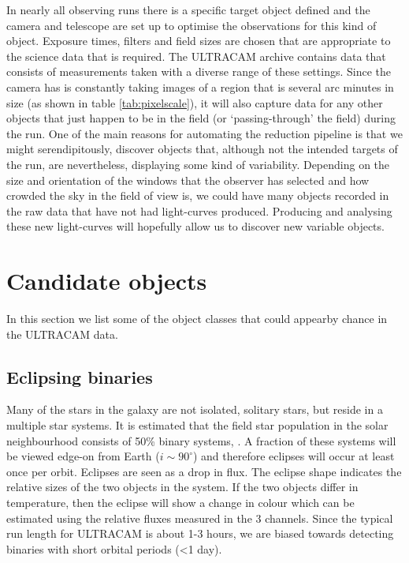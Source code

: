 In nearly all observing runs there is a specific target object defined and the camera and telescope are set up to optimise the observations for this kind of object. Exposure times, filters and field sizes are chosen that are appropriate to the science data that is required. The ULTRACAM archive contains data that consists of measurements taken with a diverse range of these settings. Since the camera has is constantly taking images of a region that is several arc minutes in size (as shown in table \ref{tab:pixelscale}), it will also capture data for any other objects that just happen to be in the field (or `passing-through' the field) during the run. One of the main reasons for automating the reduction pipeline is that we might serendipitously, discover objects that, although not the intended targets of the run, are nevertheless, displaying some kind of variability. Depending on the size and orientation of the windows that the observer has selected and how crowded the sky in the field of view is, we could have many objects recorded in the raw data that have not had light-curves produced. Producing and analysing these new light-curves will hopefully allow us to discover new variable objects. 

\section{Candidate objects}
In this section we list some of the object classes that could appearby chance in the ULTRACAM data.

\subsection{Eclipsing binaries}
Many of the stars in the galaxy are not isolated, solitary stars, but reside in a multiple star systems. It is estimated that the field star population in the solar neighbourhood consists of 50\% binary systems, \citep{binaryfraction}. A fraction of these systems will be viewed edge-on from Earth ($i \sim 90^\circ$) and therefore eclipses will occur at least once per orbit. Eclipses are seen as a drop in flux. The eclipse shape indicates the relative sizes of the two objects in the system. If the two objects differ in temperature, then the eclipse will show a change in colour which can be estimated using the relative fluxes measured in the 3 channels. Since the typical run length for ULTRACAM is about 1-3 hours, we are biased towards detecting binaries with short orbital periods (\textless 1 day). 

